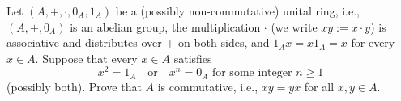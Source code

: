 %
\begin{problem}
    Let \( \left( A, +, \cdot, 0_A, 1_A \right) \) be a (possibly non-commutative) unital ring, i.e., \( \left( A, +, 0_A \right) \) is an abelian group, the multiplication \( \cdot \) (we write \( xy := x \cdot y \)) is associative and distributes over \( + \) on both sides, and \( 1_A x = x 1_A = x \) for every \( x \in A \). Suppose that every \( x \in A \) satisfies
    \[
        x^{2} = 1_A \quad \text{or} \quad x^{n} = 0_A \text{ for some integer } n \geq 1
    \]
    (possibly both). Prove that \( A \) is commutative, i.e., \( xy = yx \) for all \( x, y \in A \).
\end{problem}

